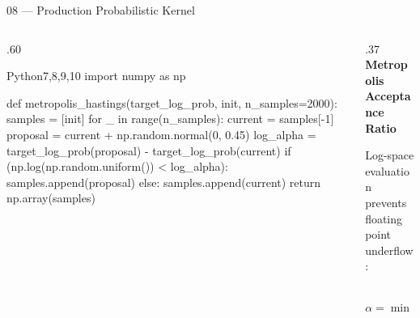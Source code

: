 \documentclass[aspectratio=169,10pt]{beamer}
\begin{document}
\begin{frame}[fragile]{08 — Production Probabilistic Kernel}
  \begin{columns}[T,onlytextwidth]
    \begin{column}{.60\textwidth}
\begin{HighlightedCodeBlock}[numbers=left]{Python}{7,8,9,10}
import numpy as np

def metropolis_hastings(target_log_prob, init,
                        n_samples=2000):
    samples = [init]
    for _ in range(n_samples):
        current = samples[-1]
        proposal = current + np.random.normal(0, 0.45)
        log_alpha = target_log_prob(proposal) - target_log_prob(current)
        if (np.log(np.random.uniform())
                < log_alpha):
            samples.append(proposal)
        else:
            samples.append(current)
    return np.array(samples)
\end{HighlightedCodeBlock}
    \end{column}
    \hfill
    \begin{column}{.37\textwidth}
      \vspace{.10cm}
      {\small\bfseries\color{BayesTeal}Metropolis Acceptance Ratio}\par\vspace{.08cm}
      {\small Log-space evaluation prevents floating point underflow:}\par\vspace{.08cm}
      \[
        \alpha = \min\left(1, \, \frac{p(\theta^*)}{p(\theta^{(t)})}\right)
      \]
      \vspace{.08cm}
    \end{column}
  \end{columns}
\end{frame}
\end{document}
